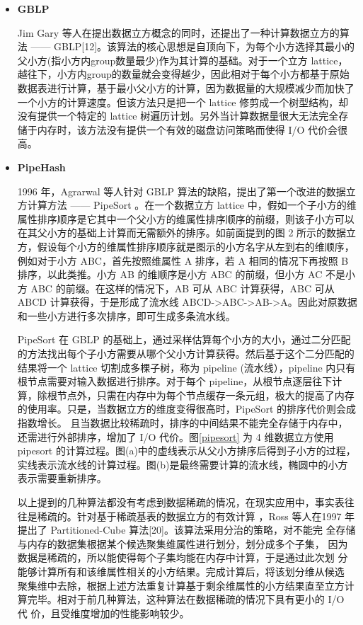 \begin{itemize}

\item \textbf{GBLP}

Jim Gary 等人在提出数据立方概念的同时，还提出了一种计算数据立方的算法 —— GBLP[12]。该算法的核心思想是自顶向下，为每个小方选择其最小的父小方(指小方内group数量最少)作为其计算的基础。对于一个立方 lattice，越往下，小方内group的数量就会变得越少，因此相对于每个小方都基于原始数据表进行计算，基于最小父小方的计算，因为数据量的大规模减少而加快了一个小方的计算速度。但该方法只是把一个 lattice 修剪成一个树型结构，却没有提供一个特定的 lattice 树遍历计划。另外当计算数据量很大无法完全存储于内存时，该方法没有提供一个有效的磁盘访问策略而使得 I/O 代价会很高。

\item \textbf{PipeHash}

1996 年，Agrarwal 等人针对 GBLP 算法的缺陷，提出了第一个改进的数据立方计算方法 —— PipeSort\cite{agarwal1996computation} 。在一个数据立方 lattice 中，假如一个子小方的维属性排序顺序是它其中一个父小方的维属性排序顺序的前缀，则该子小方可以在其父小方的基础上计算而无需额外的排序。如前面提到的图 2 所示的数据立方，假设每个小方的维属性排序顺序就是图示的小方名字从左到右的维顺序，例如对于小方 ABC，首先按照维属性 A 排序，若 A 相同的情况下再按照 B 排序，以此类推。小方 AB 的维顺序是小方 ABC 的前缀，但小方 AC 不是小方 ABC 的前缀。在这样的情况下，AB 可从 ABC 计算获得，ABC 可从 ABCD 计算获得，于是形成了流水线 ABCD-\textgreater ABC-\textgreater AB-\textgreater A。因此对原数据和一些小方进行多次排序，即可生成多条流水线。

PipeSort 在 GBLP 的基础上，通过采样估算每个小方的大小，通过二分匹配的方法找出每个子小方需要从哪个父小方计算获得。然后基于这个二分匹配的结果将一个 lattice 切割成多棵子树，称为 pipeline (流水线），pipeline 内只有根节点需要对输入数据进行排序。对于每个 pipeline，从根节点逐层往下计算，除根节点外，只需在内存中为每个节点缓存一条元组，极大的提高了内存的使用率。只是，当数据立方的维度变得很高时，PipeSort 的排序代价则会成指数增长。 且当数据比较稀疏时，排序的中间结果不能完全存储于内存中，还需进行外部排序，增加了 I/O 代价。图\ref{pipesort} 为 4 维数据立方使用 pipesort 的计算过程。图(a)中的虚线表示从父小方排序后得到子小方的过程，实线表示流水线的计算过程。图(b)是最终需要计算的流水线，椭圆中的小方表示需要重新排序。

以上提到的几种算法都没有考虑到数据稀疏的情况，在现实应用中，事实表往往是稀疏的。针对基于稀疏基表的数据立方的有效计算 ，Ross 等人在1997 年提出了 Partitioned-Cube 算法[20]。该算法采用分治的策略，对不能完
全存储与内存的数据集根据某个候选聚集维属性进行划分，划分成多个子集，
因为数据是稀疏的，所以能使得每个子集均能在内存中计算，于是通过此次划
分能够计算所有和该维属性相关的小方结果。完成计算后，将该划分维从候选
聚集维中去除，根据上述方法重复计算基于剩余维属性的小方结果直至立方计
算完毕。相对于前几种算法，这种算法在数据稀疏的情况下具有更小的 I/O 代
价，且受维度增加的性能影响较少。


\end{itemize}
